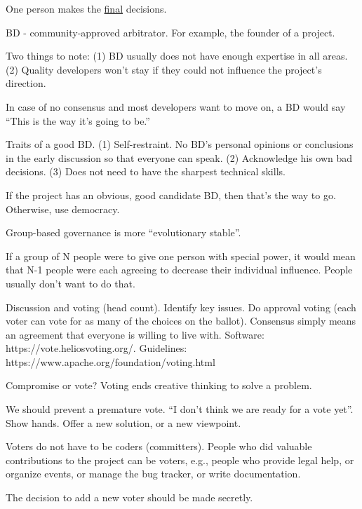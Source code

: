 \documentclass[landscape,30pt]{foils}
\begin{document}

One person makes the \underline{final} decisions.

BD - community-approved arbitrator. For example, the founder of a project.

Two things to note: (1) BD usually does not have enough expertise in all areas.  (2) Quality developers won't stay if they could not influence the project's direction.

In case of no consensus and most developers want to move on, a BD would say ``This is the way it's going to be.''

Traits of a good BD.  (1) Self-restraint.  No BD's personal opinions or conclusions in the early discussion so that everyone can speak.  (2) Acknowledge his own bad decisions. (3) Does not need to have the sharpest technical skills.

If the project has an obvious, good candidate BD, then that's the way to go.  Otherwise, use democracy.


Group-based governance is more ``evolutionary stable''.

If a group of N people were to give one person with special power, it would mean that N-1 people were each agreeing
to decrease their individual influence.  People usually don't want to do that.

Discussion and voting (head count).  Identify key issues.  Do approval voting (each voter can vote for as many of the choices on the ballot).   Consensus simply means an agreement that everyone is willing to live with.  Software: https://vote.heliosvoting.org/. Guidelines: https://www.apache.org/foundation/voting.html

Compromise or vote?  Voting ends creative thinking to solve a problem.

We should prevent a premature vote. ``I don't think we are ready for a vote yet''.  Show hands.  Offer a new solution, or a new viewpoint.

Voters do not have to be coders (committers).  People who did valuable contributions to the project can be voters, e.g., people who provide legal help, or organize events, or manage the bug tracker, or write documentation.

The decision to add a new voter should be made secretly.
\end{document}
